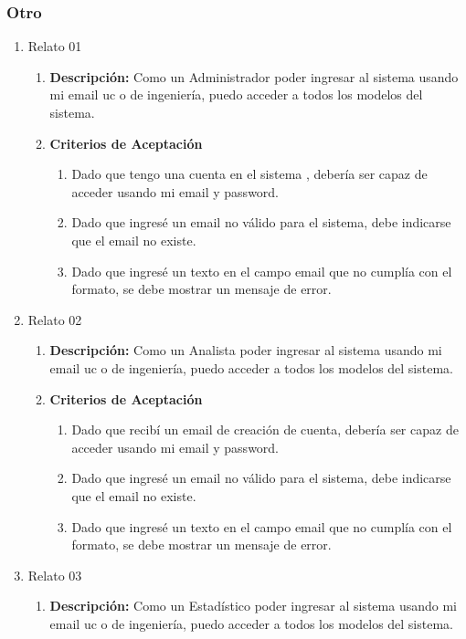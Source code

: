 \subsubsection{Otro}

\begin{enumerate}
	\item Relato 01
		\begin{enumerate}
			\item \textbf{Descripción:} Como un Administrador poder ingresar al sistema usando mi email uc o de ingeniería, puedo acceder a todos los modelos del sistema.
			\item \textbf{Criterios de Aceptación}
				\begin{enumerate}
					\item Dado que tengo una cuenta en el sistema , debería ser capaz de acceder usando mi email y password.
					\item Dado que ingresé un email no válido para el sistema, debe indicarse que el email no existe.
					\item Dado que ingresé un texto en el campo email que no cumplía con el formato, se debe mostrar un mensaje de error.
				\end{enumerate}
		\end{enumerate}
	\item Relato 02
		\begin{enumerate}
			\item \textbf{Descripción:} Como un Analista poder ingresar al sistema usando mi email uc o de ingeniería, puedo acceder a todos los modelos del sistema.
			\item \textbf{Criterios de Aceptación}
				\begin{enumerate}
					\item Dado que recibí un email de creación de cuenta, debería ser capaz de acceder usando mi email y password.
					\item Dado que ingresé un email no válido para el sistema, debe indicarse que el email no existe.
					\item Dado que ingresé un texto en el campo email que no cumplía con el formato, se debe mostrar un mensaje de error.
				\end{enumerate}
		\end{enumerate}
	\item Relato 03
		\begin{enumerate}
			\item \textbf{Descripción:} Como un Estadístico poder ingresar al sistema usando mi email uc o de ingeniería, puedo acceder a todos los modelos del sistema.

\end{enumerate}
\end{enumerate}

